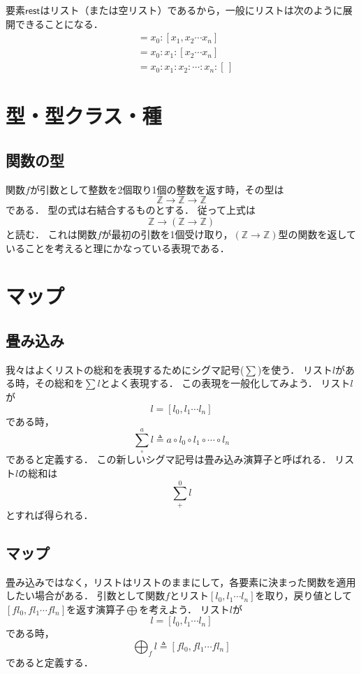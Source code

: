 \documentclass[twocolumn]{jsbook}
\newcommand{\integertype}{\mathbb{Z}}
\newcommand{\mapfunc}{\bigoplus}
\newcommand{\restelems}{\textsf{rest}}
\begin{document}
要素$\restelems$はリスト（または空リスト）であるから，一般にリストは次のように展開できることになる．
\begin{align*}
[x_0,x_1,x_2\dotsb x_n]&=x_0:[x_1,x_2\dotsb x_n]\\
&=x_0:x_1:[x_2\dotsb x_n]\\
&=x_0:x_1:x_2:\dotsb:x_n:[\,]
\end{align*}

\chapter{型・型クラス・種}

\section{関数の型}

関数$f$が引数として整数を2個取り1個の整数を返す時，その型は$$\integertype\rightarrow\integertype\rightarrow\integertype$$である．
型の式は右結合するものとする．
従って上式は$$\integertype\rightarrow\left(\integertype\rightarrow\integertype\right)$$と読む．
これは関数$f$が最初の引数を1個受け取り，$(\integertype\rightarrow\integertype)$型の関数を返していることを考えると理にかなっている表現である．

\chapter{マップ}

\section{畳み込み}

我々はよくリストの総和を表現するためにシグマ記号($\sum$)を使う．
リスト$l$がある時，その総和を$\sum l$とよく表現する．
この表現を一般化してみよう．
リスト$l$が$$l=[l_0,l_1\dotsb l_n]$$である時，$$\sum_\circ^a l\triangleq a\circ l_0\circ l_1\circ\dotsb\circ l_n$$であると定義する．
この新しいシグマ記号は畳み込み演算子と呼ばれる．
リスト$l$の総和は$$\sum_+^0l$$とすれば得られる．

\section{マップ}

畳み込みではなく，リストはリストのままにして，各要素に決まった関数を適用したい場合がある．
引数として関数$f$とリスト$[l_0,l_1\dotsb l_n]$を取り，戻り値として$[fl_0,fl_1\dotsb fl_n]$を返す演算子$\mapfunc$を考えよう．
リスト$l$が$$l=[l_0,l_1\dotsb l_n]$$である時，$$\mapfunc_f l\triangleq [fl_0,fl_1\dotsb fl_n]$$であると定義する．
\end{document}

